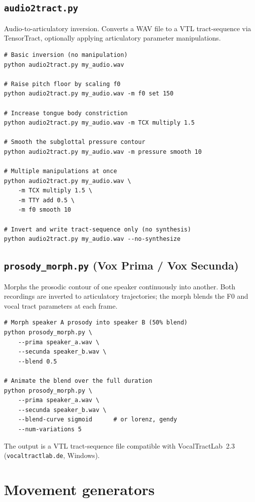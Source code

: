 \subsection*{\texttt{audio2tract.py}}

Audio-to-articulatory inversion. Converts a WAV file to a VTL
tract-sequence via TensorTract, optionally applying articulatory
parameter manipulations.

\begin{verbatim}
# Basic inversion (no manipulation)
python audio2tract.py my_audio.wav

# Raise pitch floor by scaling f0
python audio2tract.py my_audio.wav -m f0 set 150

# Increase tongue body constriction
python audio2tract.py my_audio.wav -m TCX multiply 1.5

# Smooth the subglottal pressure contour
python audio2tract.py my_audio.wav -m pressure smooth 10

# Multiple manipulations at once
python audio2tract.py my_audio.wav \
    -m TCX multiply 1.5 \
    -m TTY add 0.5 \
    -m f0 smooth 10

# Invert and write tract-sequence only (no synthesis)
python audio2tract.py my_audio.wav --no-synthesize
\end{verbatim}

\subsection*{\texttt{prosody\_morph.py} (Vox Prima / Vox Secunda)}

Morphs the prosodic contour of one speaker continuously into another.
Both recordings are inverted to articulatory trajectories; the morph
blends the F0 and vocal tract parameters at each frame.

\begin{verbatim}
# Morph speaker A prosody into speaker B (50% blend)
python prosody_morph.py \
    --prima speaker_a.wav \
    --secunda speaker_b.wav \
    --blend 0.5

# Animate the blend over the full duration
python prosody_morph.py \
    --prima speaker_a.wav \
    --secunda speaker_b.wav \
    --blend-curve sigmoid      # or lorenz, gendy
    --num-variations 5
\end{verbatim}

The output is a VTL tract-sequence file compatible with VocalTractLab~2.3
(\texttt{vocaltractlab.de}, Windows).

\section*{Movement generators}


